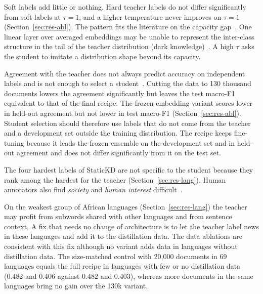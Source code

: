 \documentclass{ieeeaccess}
\begin{document}
Soft labels add little or nothing. Hard teacher labels do not differ significantly from soft labels at $\tau=1$, and a higher temperature never improves on $\tau=1$ (Section~\ref{sec:res-abl}). The pattern fits the literature on the capacity gap~\cite{zhang2025law,wang2026rckd}. One linear layer over averaged embeddings may be unable to represent the inter-class structure in the tail of the teacher distribution (dark knowledge)~\cite{zhao2022dkd}. A high $\tau$ asks the student to imitate a distribution shape beyond its capacity.

Agreement with the teacher does not always predict accuracy on independent labels and is not enough to select a student~\cite{stanton2021kd}. Cutting the data to 130 thousand documents lowers the agreement significantly but leaves the test macro-F1 equivalent to that of the final recipe. The frozen-embedding variant scores lower in held-out agreement but not lower in test macro-F1 (Section~\ref{sec:res-abl}). Student selection should therefore use labels that do not come from the teacher and a development set outside the training distribution. The recipe keeps fine-tuning because it leads the frozen ensemble on the development set and in held-out agreement and does not differ significantly from it on the test set.

The four hardest labels of StaticKD are not specific to the student because they rank among the hardest for the teacher (Section~\ref{sec:res-lang}). Human annotators also find \emph{society} and \emph{human interest} difficult~\cite{kuzman2025llm}.

On the weakest group of African languages (Section~\ref{sec:res-lang}) the teacher may profit from subwords shared with other languages and from sentence context. A fix that needs no change of architecture is to let the teacher label news in these languages and add it to the distillation data. The data ablations are consistent with this fix although no variant adds data in languages without distillation data. The size-matched control with 20,000 documents in 69 languages equals the full recipe in languages with few or no distillation data (0.482 and 0.406 against 0.482 and 0.403), whereas more documents in the same languages bring no gain over the 130k variant.
\end{document}
